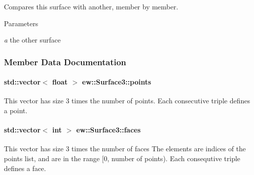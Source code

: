 \label{classew_1_1Surface3_ac4b7f1d423b851423afbabb08ced40f4}
Compares this surface with another, member by member. 
\begin{DoxyParams}{Parameters}
\item[{\em a}]the other surface \end{DoxyParams}


\subsubsection{Member Data Documentation}
\hypertarget{classew_1_1Surface3_ae11685212f32705b1ef71ef60960a38f}{
\paragraph[{points}]{\setlength{\rightskip}{0pt plus 5cm}std::vector$<$ float $>$ {\bf ew::Surface3::points}}\hfill}
\label{classew_1_1Surface3_ae11685212f32705b1ef71ef60960a38f}
This vector has size 3 times the number of points. Each consecutive triple defines a point. \hypertarget{classew_1_1Surface3_a97197763846e0f10ca529f0812de29d5}{
\paragraph[{faces}]{\setlength{\rightskip}{0pt plus 5cm}std::vector$<$ int $>$ {\bf ew::Surface3::faces}}\hfill}
\label{classew_1_1Surface3_a97197763846e0f10ca529f0812de29d5}
This vector has size 3 times the number of faces The elements are indices of the points list, and are in the range \mbox{[}0, number of points). Each consequtive triple defines a face. 